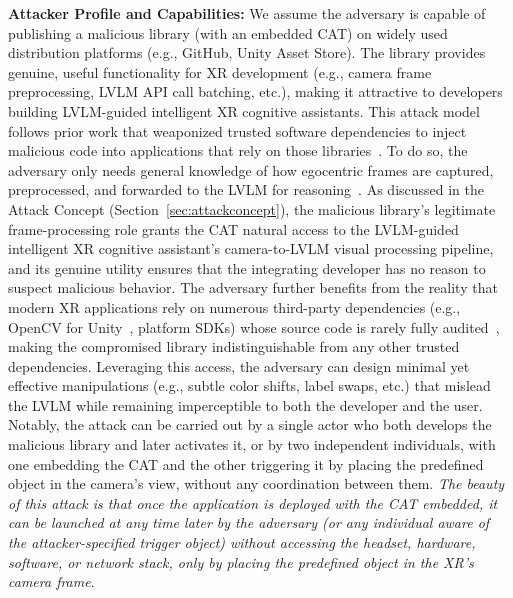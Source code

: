 \documentclass[sigconf,review,anonymous]{acmart}
\begin{document}
\textbf{Attacker Profile and Capabilities:} We assume the adversary is capable of publishing a malicious library (with an embedded CAT) on widely used distribution platforms (e.g., GitHub, Unity Asset Store). The library provides genuine, useful functionality for XR development (e.g., camera frame preprocessing, LVLM API call batching, etc.), making it attractive to developers building LVLM-guided intelligent XR cognitive assistants. This attack model follows prior work that weaponized trusted software dependencies to inject malicious code into applications that rely on those libraries~\cite{ladisa2023sok, ohm2020backstabber}. To do so, the adversary only needs general knowledge of how egocentric frames are captured, preprocessed, and forwarded to the LVLM for reasoning~\cite{srinidhi2024xair, zhao2025guided, qorbani2025teaching, achiam2023gpt}. As discussed in the Attack Concept (Section~\ref{sec:attackconcept}), the malicious library's legitimate frame-processing role grants the CAT natural access to the LVLM-guided intelligent XR cognitive assistant's camera-to-LVLM visual processing pipeline, and its genuine utility ensures that the integrating developer has no reason to suspect malicious behavior. The adversary further benefits from the reality that modern XR applications rely on numerous third-party dependencies (e.g., OpenCV for Unity~\cite{opencvforunity}, platform SDKs) whose source code is rarely fully audited~\cite{ladisa2023sok}, making the compromised library indistinguishable from any other trusted dependencies. Leveraging this access, the adversary can design minimal yet effective manipulations (e.g., subtle color shifts, label swaps, etc.) that mislead the LVLM while remaining imperceptible to both the developer and the user. Notably, the attack can be carried out by a single actor who both develops the malicious library and later activates it, or by two independent individuals, with one embedding the CAT and the other triggering it by placing the predefined object in the camera's view, without any coordination between them. \emph{The beauty of this attack is that once the application is deployed with the CAT embedded, it can be launched  at any time later by the adversary (or any individual aware of the attacker-specified trigger object) without accessing the headset, hardware, software, or network stack, only by placing the predefined object in the XR’s camera frame}.
\end{document}
